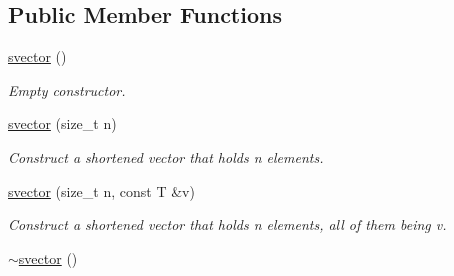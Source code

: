 \subsection*{Public Member Functions}
\begin{DoxyCompactItemize}
\item 
\hyperlink{classlgraph_1_1utils_1_1svector_ae2587ed7933a70b8367e178dd61f90f9}{svector} ()\hypertarget{classlgraph_1_1utils_1_1svector_ae2587ed7933a70b8367e178dd61f90f9}{}\label{classlgraph_1_1utils_1_1svector_ae2587ed7933a70b8367e178dd61f90f9}

\begin{DoxyCompactList}\small\item\em Empty constructor. \end{DoxyCompactList}\item 
\hyperlink{classlgraph_1_1utils_1_1svector_aae71cfdb8e4d66c25a255b4a6bc7ad1c}{svector} (size\+\_\+t n)\hypertarget{classlgraph_1_1utils_1_1svector_aae71cfdb8e4d66c25a255b4a6bc7ad1c}{}\label{classlgraph_1_1utils_1_1svector_aae71cfdb8e4d66c25a255b4a6bc7ad1c}

\begin{DoxyCompactList}\small\item\em Construct a shortened vector that holds {\itshape n} elements. \end{DoxyCompactList}\item 
\hyperlink{classlgraph_1_1utils_1_1svector_a350de4ad59381c976905881480b0ed05}{svector} (size\+\_\+t n, const T \&v)\hypertarget{classlgraph_1_1utils_1_1svector_a350de4ad59381c976905881480b0ed05}{}\label{classlgraph_1_1utils_1_1svector_a350de4ad59381c976905881480b0ed05}

\begin{DoxyCompactList}\small\item\em Construct a shortened vector that holds {\itshape n} elements, all of them being {\itshape v}. \end{DoxyCompactList}\item 
\hyperlink{classlgraph_1_1utils_1_1svector_a32558a0ffa1a78f192d4294e37922cbe}{$\sim$svector} ()\hypertarget{classlgraph_1_1utils_1_1svector_a32558a0ffa1a78f192d4294e37922cbe}{}\label{classlgraph_1_1utils_1_1svector_a32558a0ffa1a78f192d4294e37922cbe}


\end{DoxyCompactItemize}
